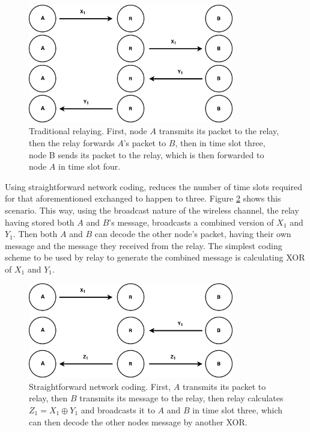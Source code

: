 \begin{figure}
    \centering
    \includegraphics[width=0.8\textwidth]{figures/traditionalRelay.pdf}
    \caption{Traditional relaying. First, node $A$ transmits its packet to the relay, then the relay forwards $A$'s packet to $B$, then in time slot three, node B sends its packet to the relay, which is then forwarded to node $A$ in time slot four.} \label{fig:traditionalRelay}
\end{figure}

Using straightforward network coding, reduces the number of time slots required for that aforementioned exchanged to happen to three. Figure \ref{fig:straightforwardNC} shows this scenario. This way, using the broadcast nature of the wireless channel, the relay having stored both $A$ and $B$'s message, broadcasts a combined version of $X_1$ and $Y_1$. Then both $A$ and $B$ can decode the other node's packet, having their own message and the message they received from the relay. The simplest coding scheme to be used by relay to generate the combined message is calculating XOR of  $X_1$ and $Y_1$.

\begin{figure} 
    \centering
    \includegraphics[width=0.8\textwidth]{figures/straightforwardNC.pdf}
    \caption{Straightforward network coding. First, $A$ transmits its packet to relay, then $B$ transmits its message to the relay, then relay calculates $Z_1=X_1 \oplus Y_1$ and broadcasts it to $A$ and $B$ in time slot three, which can then decode the other nodes message by another XOR.} \label{fig:straightforwardNC}
\end{figure}

